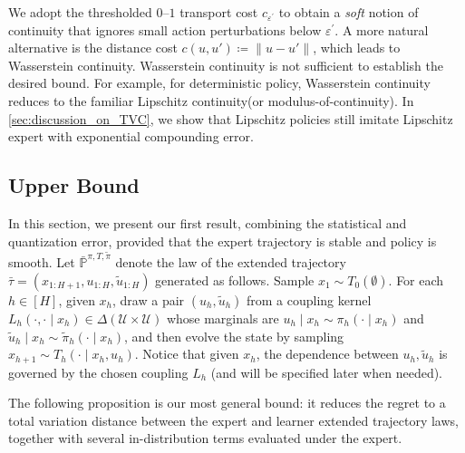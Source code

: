 \documentclass{article}
\begin{document}
\begin{remark}
We adopt the thresholded $0$--$1$ transport cost $c_{\varepsilon^\prime}$ to obtain a \emph{soft} notion of continuity that ignores small action perturbations below $\varepsilon^\prime$. A more natural alternative is the distance cost
$c(u,u') \coloneqq  \|u-u'\|$, which leads to Wasserstein continuity. Wasserstein continuity is not sufficient to establish the desired bound. For example, for deterministic policy, Wasserstein continuity reduces to the familiar Lipschitz continuity(or modulus-of-continuity). In \cref{sec:discussion_on_TVC}, we show that Lipschitz policies still imitate Lipschitz expert with exponential compounding error.

\end{remark}

\subsection{Upper Bound}
In this section, we present our first result, combining the statistical and quantization error, provided that the expert trajectory is stable and policy is smooth. Let $\bar{\mathbb P}^{\pi,T,\tilde\pi}$ denote the law of the extended trajectory
$\bar\tau=(x_{1:H+1},u_{1:H},\tilde u_{1:H})$ generated as follows.
Sample $x_1\sim T_0(\emptyset)$. For each $h\in[H]$, given $x_h$, draw a pair $(u_h,\tilde u_h)$ from a
coupling kernel $L_h(\cdot,\cdot\mid x_h)\in\Delta(\mathcal U\times\mathcal U)$ whose marginals are $u_h\mid x_h\sim \pi_h(\cdot\mid x_h)$ and $\tilde u_h\mid x_h\sim \tilde\pi_h(\cdot\mid x_h)$,
and then evolve the state by sampling $x_{h+1}\sim T_h(\cdot\mid x_h,u_h)$. Notice that given $x_h$, the dependence between $u_h, \tilde u_h$ is governed by the chosen coupling $L_h$ (and will be specified later when needed).

The following proposition is our most general bound: it reduces the regret to a total variation distance between the expert and learner extended trajectory laws, together with several in-distribution terms evaluated under the expert.
\end{document}
